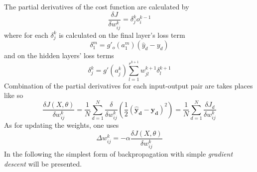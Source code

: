 The partial derivatives of the cost function are calculated by
\begin{equation}
	\label{eq:backprop_one}
	\frac{\delta J}{\delta w_{ij}^{k}} = \delta_j^k o_i^{k-1}
\end{equation}
where for each $ \delta_j^k $ is calculated on the final layer's loss term
\begin{equation}
	\label{eq:backprop_two}
	\delta_1^m = g'_o (a_1^m)(\hat{y}_d - y_d)
\end{equation}
and on the hidden layers' loss terms
\begin{equation}
	\label{eq:backprop_three}
	\delta_j^k = g'(a_j^k) \sum_{l=1}^{r^{k+1}} w_{jl}^{k+1} \delta_l^{k+1}
\end{equation}
Combination of the partial derivatives for each input-output pair are takes places like so
\begin{equation}
	\label{eq:backprop_four}
	\frac{\delta J(X, \theta)}{\delta w_{ij}^k} = \frac{1}{N} \sum_{d=1}^{N} \frac{\delta}{\delta w_{ij}^{k}} \left( \frac{1}{2} (\boldsymbol{\hat{y}_d} - \boldsymbol{y_d})^2 \right) = \frac{1}{N} \sum_{d=1}^{N} \frac{\delta J_d}{\delta w_{ij}^k}
\end{equation}
As for updating the weights, one uses
\begin{equation}
	\label{eq:backprop_five}
	\Delta w_{ij}^{k} = - \alpha \frac{\delta J(X, \theta)}{\delta w_{ij}^{k}}
\end{equation}
In the following the simplest form of backpropagation with simple \textit{gradient descent} will be presented.
